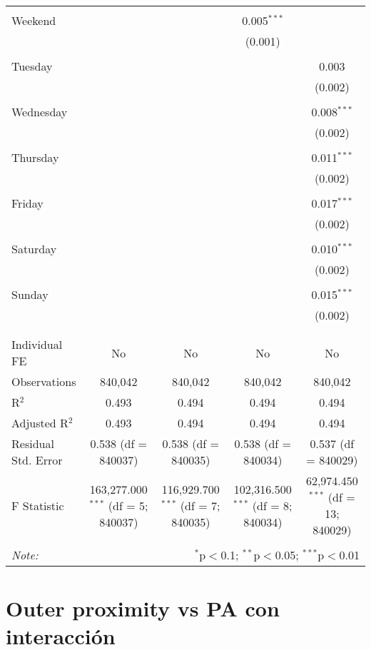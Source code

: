 \documentclass[
]{article}
\begin{document}
\begin{table}[!htbp]
{\begin{tabular}{@{\extracolsep{5pt}}lcccc}
  & & & & \\ 
 Weekend &  &  & 0.005$^{***}$ &  \\ 
  &  &  & (0.001) &  \\ 
  & & & & \\ 
 Tuesday &  &  &  & 0.003 \\ 
  &  &  &  & (0.002) \\ 
  & & & & \\ 
 Wednesday &  &  &  & 0.008$^{***}$ \\ 
  &  &  &  & (0.002) \\ 
  & & & & \\ 
 Thursday &  &  &  & 0.011$^{***}$ \\ 
  &  &  &  & (0.002) \\ 
  & & & & \\ 
 Friday &  &  &  & 0.017$^{***}$ \\ 
  &  &  &  & (0.002) \\ 
  & & & & \\ 
 Saturday &  &  &  & 0.010$^{***}$ \\ 
  &  &  &  & (0.002) \\ 
  & & & & \\ 
 Sunday &  &  &  & 0.015$^{***}$ \\ 
  &  &  &  & (0.002) \\ 
  & & & & \\ 
\hline \\[-1.8ex] 
Individual FE & No & No & No & No \\ 
Observations & 840,042 & 840,042 & 840,042 & 840,042 \\ 
R$^{2}$ & 0.493 & 0.494 & 0.494 & 0.494 \\ 
Adjusted R$^{2}$ & 0.493 & 0.494 & 0.494 & 0.494 \\ 
Residual Std. Error & 0.538 (df = 840037) & 0.538 (df = 840035) & 0.538 (df = 840034) & 0.537 (df = 840029) \\ 
F Statistic & 163,277.000$^{***}$ (df = 5; 840037) & 116,929.700$^{***}$ (df = 7; 840035) & 102,316.500$^{***}$ (df = 8; 840034) & 62,974.450$^{***}$ (df = 13; 840029) \\ 
\hline 
\hline \\[-1.8ex] 
\textit{Note:}  & \multicolumn{4}{r}{$^{*}$p$<$0.1; $^{**}$p$<$0.05; $^{***}$p$<$0.01} \\ 
\end{tabular}
} 
\end{table} 
\newpage
\section{Outer proximity vs PA con interacción}
\end{document}
